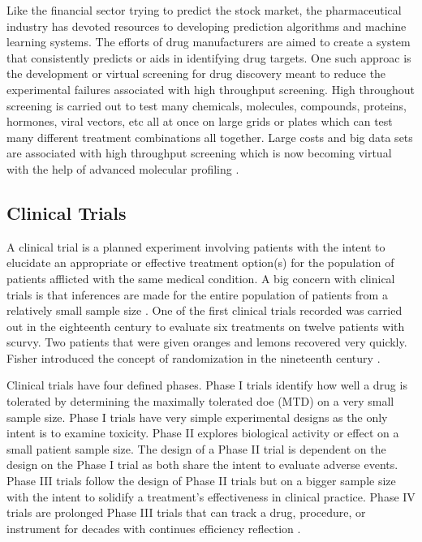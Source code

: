 \documentclass[sigconf]{acmart}
\begin{document}
Like the financial sector trying to predict the stock market, the pharmaceutical industry has devoted resources to developing prediction algorithms and machine learning systems. The efforts of drug manufacturers are aimed to create a system that consistently predicts or aids in identifying drug targets. One such approac is the development or virtual screening for drug discovery meant to reduce the experimental failures associated with high throughput screening. High throughout screening is carried out to test many chemicals, molecules, compounds, proteins, hormones, viral vectors, etc all at once on large grids or plates which can test many different treatment combinations all together. Large costs and big data sets are associated with high throughput screening which is now becoming virtual with the help of advanced molecular profiling \cite{kitchen}.

\subsection{Clinical Trials}
A clinical trial is a planned experiment involving patients with the intent to elucidate an appropriate or effective treatment option(s) for the population of patients afflicted with the same medical condition. A big concern with clinical trials is that inferences are made for the entire population of patients from a relatively small sample size \cite{Pocock}. One of the first clinical trials recorded was carried out in the eighteenth century to evaluate six treatments on  twelve patients with scurvy. Two patients that were given oranges and lemons recovered very quickly. Fisher introduced the concept of randomization in the nineteenth century \cite{Friedman}.

Clinical trials have four defined phases. Phase I trials identify how well a drug is tolerated by determining the maximally tolerated doe (MTD) on a very small sample size. Phase I trials have very simple experimental designs as the only intent is to examine toxicity. Phase II explores biological activity or effect on a small patient sample size. The design of a Phase II trial is dependent on the design on the Phase I trial as both share the intent to evaluate adverse events. Phase III trials follow the design of Phase II trials but on a bigger sample size with the intent to solidify a treatment's effectiveness in clinical practice. Phase IV trials are prolonged Phase III trials that can track a drug, procedure, or instrument for decades with continues efficiency reflection \cite{Friedman}. 
\end{document}
